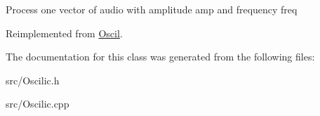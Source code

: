 Process one vector of audio with amplitude amp and frequency freq 

Reimplemented from \hyperlink{class_oscil_abca4352d264fd66538502c72c2440784}{Oscil}.



The documentation for this class was generated from the following files\+:\begin{DoxyCompactItemize}
\item 
src/Oscilic.\+h\item 
src/Oscilic.\+cpp\end{DoxyCompactItemize}
